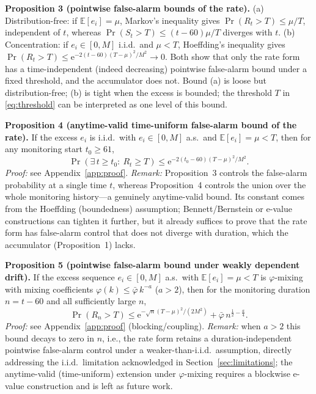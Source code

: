 \documentclass[journal]{IEEEtran}
\newcommand{\E}{\mathbb{E}}
\newcommand{\Prb}{\Pr}
\begin{document}
\textbf{Proposition 3 (pointwise false-alarm bounds of the rate).} (a) Distribution-free: if $\E[e_i]=\mu$, Markov's inequality gives $\Prb(R_t>T)\le\mu/T$, independent of $t$, whereas $\Prb(S_t>T)\le(t-60)\mu/T$ diverges with $t$. (b) Concentration: if $e_i\in[0,M]$ i.i.d.\ and $\mu<T$, Hoeffding's inequality gives $\Prb(R_t>T)\le\mathrm{e}^{-2(t-60)(T-\mu)^2/M^2}\to0$. Both show that only the rate form has a time-independent (indeed decreasing) pointwise false-alarm bound under a fixed threshold, and the accumulator does not. Bound (a) is loose but distribution-free; (b) is tight when the excess is bounded; the threshold $T$ in \eqref{eq:threshold} can be interpreted as one level of this bound.

\textbf{Proposition 4 (anytime-valid time-uniform false-alarm bound of the rate).} If the excess $e_i$ is i.i.d.\ with $e_i\in[0,M]$ a.s.\ and $\E[e_i]=\mu<T$, then for any monitoring start $t_0\ge61$,
\begin{equation}
\Prb\left(\exists\,t\ge t_0:\ R_t\ge T\right)\le\mathrm{e}^{-2(t_0-60)(T-\mu)^2/M^2}.
\label{eq:anytime}
\end{equation}
\emph{Proof:} see Appendix~\ref{app:proof}. \emph{Remark:} Proposition~3 controls the false-alarm probability at a single time $t$, whereas Proposition~4 controls the union over the whole monitoring history---a genuinely anytime-valid bound. Its constant comes from the Hoeffding (boundedness) assumption; Bennett/Bernstein or e-value constructions can tighten it further, but it already suffices to prove that the rate form has false-alarm control that does not diverge with duration, which the accumulator (Proposition~1) lacks.

\textbf{Proposition 5 (pointwise false-alarm bound under weakly dependent drift).} If the excess sequence $e_i\in[0,M]$ a.s.\ with $\E[e_i]=\mu<T$ is $\varphi$-mixing with mixing coefficients $\varphi(k)\le\bar\varphi\,k^{-a}$ ($a>2$), then for the monitoring duration $n=t-60$ and all sufficiently large $n$,
\begin{equation}
\Prb\left(R_n>T\right)\le\mathrm{e}^{-\sqrt{n}(T-\mu)^2/(2M^2)}+\bar\varphi\,n^{\frac12-\frac a4}.
\label{eq:mixing}
\end{equation}
\emph{Proof:} see Appendix~\ref{app:proof} (blocking/coupling). \emph{Remark:} when $a>2$ this bound decays to zero in $n$, i.e., the rate form retains a duration-independent pointwise false-alarm control under a weaker-than-i.i.d.\ assumption, directly addressing the i.i.d.\ limitation acknowledged in Section~\ref{sec:limitations}; the anytime-valid (time-uniform) extension under $\varphi$-mixing requires a blockwise e-value construction and is left as future work.
\end{document}
